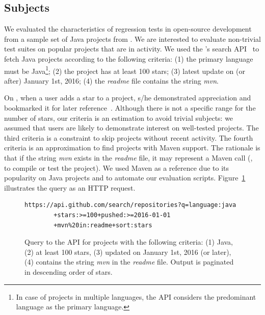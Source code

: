\subsection{Subjects}
\label{sec:subjects}

We evaluated the characteristics of regression tests in open-source
development from a sample set of Java projects from \github{}.  We are
interested to evaluate non-trivial test suites on popular projects
that are in activity. We used the \github{}'s search
API~\cite{githubsearch} to fetch Java projects according to the
following criteria: (1) the primary language must be Java\footnote{In
case of projects in multiple languages, the \github{} API considers
the predominant language as the primary language.}; (2) the project
has at least 100 stars; (3) latest update on (or after) January 1st,
2016; (4) the \emph{readme} file contains the string \emph{mvn}.

On \github{}, when a user adds a star to a project, s/he demonstrated
appreciation and bookmarked it for later
reference~\cite{github-stars}.  Although there is not a specific range
for the number of stars, our criteria is an estimation to avoid
trivial subjects: we assumed that \github{} users are likely to
demonstrate interest on well-tested projects. The third criteria is a
constraint to skip projects without recent activity. The fourth
criteria is an approximation to find projects with Maven support. The
rationale is that if the string \emph{mvn} exists in the \emph{readme}
file, it may represent a Maven call (\eg, to compile or test the
project). We used Maven as a reference due to its popularity on Java
projects and to automate our evaluation scripts.
Figure~\ref{fig:subject-query} illustrates the query as an HTTP
request.

\begin{figure}[h!]
\centering
\scriptsize
{}
\begin{lstlisting}
https://api.github.com/search/repositories?q=language:java
        +stars:>=100+pushed:>=2016-01-01
        +mvn%20in:readme+sort:stars
\end{lstlisting}
    \caption{\label{fig:subject-query} Query to the \github{} API for
    projects with the following criteria: (1) Java, (2) at least 100
    stars, (3) updated on January 1st, 2016 (or later), (4) contains
    the string \emph{mvn} in the \emph{readme} file. Output is
    paginated in descending order of stars.}
\end{figure}

